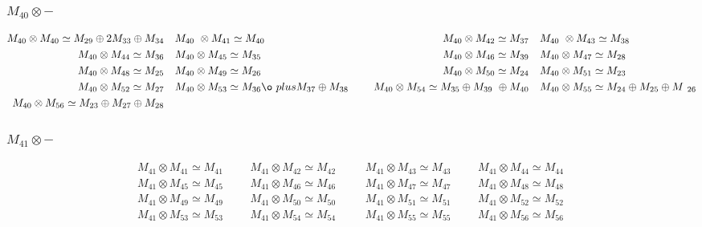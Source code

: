 \subsubsection{$M_40\otimes -$}
\begin{align*}
M_{40} \otimes M_{40} \simeq M_{29} \oplus 2 M_{33} \oplus M_{34} &&& M_{40} \
\otimes M_{41} \simeq M_{40} &&& M_{40} \otimes M_{42} \simeq M_{37} &&& M_{40\
} \otimes M_{43} \simeq M_{38}\\
M_{40} \otimes M_{44} \simeq M_{36} &&& M_{40} \otimes M_{45} \simeq M_{35} &&\
& M_{40} \otimes M_{46} \simeq M_{39} &&& M_{40} \otimes M_{47} \simeq M_{28}\
\\
M_{40} \otimes M_{48} \simeq M_{25} &&& M_{40} \otimes M_{49} \simeq M_{26} &&\
& M_{40} \otimes M_{50} \simeq M_{24} &&& M_{40} \otimes M_{51} \simeq M_{23}\
\\
M_{40} \otimes M_{52} \simeq M_{27} &&& M_{40} \otimes M_{53} \simeq M_{36} \o\
plus M_{37} \oplus M_{38} &&& M_{40} \otimes M_{54} \simeq M_{35} \oplus M_{39\
} \oplus M_{40} &&& M_{40} \otimes M_{55} \simeq M_{24} \oplus M_{25} \oplus M\
_{26}\\
M_{40} \otimes M_{56} \simeq M_{23} \oplus M_{27} \oplus M_{28}\\
\end{align*}

\subsubsection{$M_41\otimes -$}
\begin{align*}
M_{41} \otimes M_{41} \simeq M_{41} &&& M_{41} \otimes M_{42} \simeq M_{42} &&\
& M_{41} \otimes M_{43} \simeq M_{43} &&& M_{41} \otimes M_{44} \simeq M_{44}\
\\
M_{41} \otimes M_{45} \simeq M_{45} &&& M_{41} \otimes M_{46} \simeq M_{46} &&\
& M_{41} \otimes M_{47} \simeq M_{47} &&& M_{41} \otimes M_{48} \simeq M_{48}\
\\
M_{41} \otimes M_{49} \simeq M_{49} &&& M_{41} \otimes M_{50} \simeq M_{50} &&\
& M_{41} \otimes M_{51} \simeq M_{51} &&& M_{41} \otimes M_{52} \simeq M_{52}\
\\
M_{41} \otimes M_{53} \simeq M_{53} &&& M_{41} \otimes M_{54} \simeq M_{54} &&\
& M_{41} \otimes M_{55} \simeq M_{55} &&& M_{41} \otimes M_{56} \simeq M_{56}\
\\
\end{align*}


